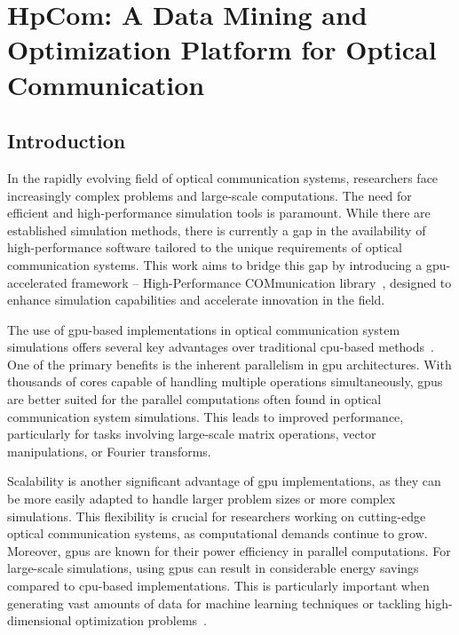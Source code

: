 \chapter{HpCom: A Data Mining and Optimization Platform for Optical Communication}
\label{ch:hpcom}

\section{Introduction}
In the rapidly evolving field of optical communication systems, researchers face increasingly complex problems and large-scale computations. The need for efficient and high-performance simulation tools is paramount. While there are established simulation methods, there is currently a gap in the availability of high-performance software tailored to the unique requirements of optical communication systems. This work aims to bridge this gap by introducing a \acrshort{gpu}-accelerated framework -- High-Performance COMmunication library~\cite{esf0_2023_7880552}, designed to enhance simulation capabilities and accelerate innovation in the field.

The use of \acrshort{gpu}-based implementations in optical communication system simulations offers several key advantages over traditional \acrshort{cpu}-based methods~\cite{brehler2017gpu}. One of the primary benefits is the inherent parallelism in \acrshort{gpu} architectures. With thousands of cores capable of handling multiple operations simultaneously, \acrshort{gpu}s are better suited for the parallel computations often found in optical communication system simulations. This leads to improved performance, particularly for tasks involving large-scale matrix operations, vector manipulations, or Fourier transforms.

Scalability is another significant advantage of \acrshort{gpu} implementations, as they can be more easily adapted to handle larger problem sizes or more complex simulations. This flexibility is crucial for researchers working on cutting-edge optical communication systems, as computational demands continue to grow.
Moreover, \acrshort{gpu}s are known for their power efficiency in parallel computations. For large-scale simulations, using \acrshort{gpu}s can result in considerable energy savings compared to \acrshort{cpu}-based implementations. This is particularly important when generating vast amounts of data for machine learning techniques or tackling high-dimensional optimization problems~\cite{srivallapanondh2022knowledge, genty2021machine, reznichenko2022optimal}.

